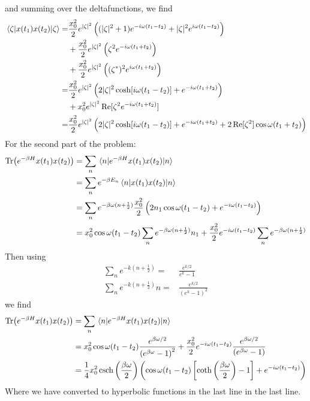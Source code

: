 \documentclass[a4paper,11pt]{article}
\begin{document}
and summing over the deltafunctions, we find
\begin{equation}
	\begin{aligned}
		\mel{\zeta}{x(t_1)x(t_2)}{\zeta}
		=&\frac{x_0^2}{2}e^{|\zeta|^2}\left((|\zeta|^{2}+1)e^{-i\omega (t_1-t_2)}+|\zeta|^2 e^{i\omega (t_1-t_2)}\right)\\
		&+\frac{x_0^2}{2}e^{|\zeta|^2}\left(\zeta^2 e^{-i\omega (t_1+t_2)}\right)\\
	&+\frac{x_0^2}{2}e^{|\zeta|^2}\left((\zeta^*)^2 e^{i\omega (t_1+t_2)}\right)\\
	=&\frac{x_0^2}{2}e^{|\zeta|^2}\left(2|\zeta|^{2}\cosh[i\omega(t_1-t_2)]+e^{-i\omega (t_1+t_2)}\right)\\
	&+x_0^2e^{|\zeta|^2}\Re[\zeta^2 e^{-i\omega (t_1+t_2)}]\\
		=&\frac{x_0^2}{2}e^{|\zeta|^2}\left(2|\zeta|^{2}\cosh[i\omega(t_1-t_2)]+e^{-i\omega (t_1+t_2)}+2\Re[\zeta^2]\cos{\omega (t_1+t_2)}\right)
	\end{aligned}
\end{equation}
For the second part of the problem:
\begin{equation}
\begin{aligned}
\Tr(e^{-\beta H}x(t_1)x(t_2))&=\sum_n \mel{n}{e^{-\beta H}x(t_1)x(t_2)}{n}\\
&=\sum_ne^{-\beta E_n} \mel{n}{x(t_1)x(t_2)}{n}\\
&=\sum_ne^{-\beta\omega (n+\frac{1}{2})}\frac{x_0^2}{2}\left(2n_1\cos{\omega (t_1-t_2)}+e^{-i\omega(t_1-t_2)}\right)\\
&=x_0^2\cos{\omega (t_1-t_2)}\sum_ne^{-\beta\omega (n+\frac{1}{2})}n_1+\frac{x_0^2}{2}e^{-i\omega(t_1-t_2)}\sum_ne^{-\beta\omega(n+\frac{1}{2})}\\
\end{aligned}
\end{equation}
Then using
\begin{equation}
	\begin{aligned}
		\sum_{n}e^{-k(n+\frac{1}{2})}=&\frac{e^{k/2}}{e^{k}-1}\\
		\sum_{n}e^{-k(n+\frac{1}{2})}n=&\frac{e^{k/2}}{\left(e^{k}-1\right)^2}
	\end{aligned}
\end{equation}
we find
\begin{equation}
	\begin{aligned}
		\Tr(e^{-\beta H}x(t_1)x(t_2))&=\sum_n \mel{n}{e^{-\beta H}x(t_1)x(t_2)}{n}\\
		&=x_0^2\cos{\omega (t_1-t_2)}\frac{e^{\beta \omega /2}}{\left(e^{\beta \omega }-1\right)^2}+\frac{x_0^2}{2}e^{-i\omega(t_1-t_2)}\frac{e^{\beta \omega /2}}{\left(e^{\beta \omega }-1\right)}
		\\
		&=\frac{1}{4} x_0^2 \csch\left(\frac{\beta\omega}{2}\right) \left(\cos{\omega (t_1-t_2)} \left[\coth \left(\frac{\beta\omega}{2}\right)-1\right]+e^{-i\omega(t_1-t_2)}\right)
	\end{aligned}
\end{equation}
Where we have converted to hyperbolic functions in the last line in the last line.
\newpage
\end{document}
